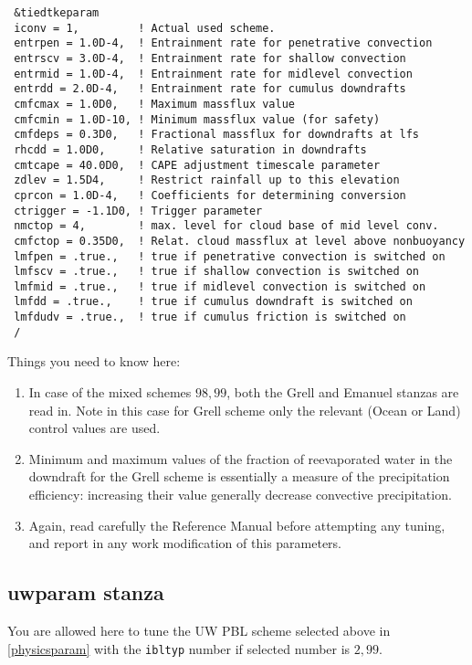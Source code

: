 {\begin{Verbatim}
 &tiedtkeparam
 iconv = 1,         ! Actual used scheme.
 entrpen = 1.0D-4,  ! Entrainment rate for penetrative convection
 entrscv = 3.0D-4,  ! Entrainment rate for shallow convection
 entrmid = 1.0D-4,  ! Entrainment rate for midlevel convection
 entrdd = 2.0D-4,   ! Entrainment rate for cumulus downdrafts
 cmfcmax = 1.0D0,   ! Maximum massflux value 
 cmfcmin = 1.0D-10, ! Minimum massflux value (for safety)
 cmfdeps = 0.3D0,   ! Fractional massflux for downdrafts at lfs
 rhcdd = 1.0D0,     ! Relative saturation in downdrafts
 cmtcape = 40.0D0,  ! CAPE adjustment timescale parameter
 zdlev = 1.5D4,     ! Restrict rainfall up to this elevation
 cprcon = 1.0D-4,   ! Coefficients for determining conversion
 ctrigger = -1.1D0, ! Trigger parameter
 nmctop = 4,        ! max. level for cloud base of mid level conv.
 cmfctop = 0.35D0,  ! Relat. cloud massflux at level above nonbuoyancy
 lmfpen = .true.,   ! true if penetrative convection is switched on
 lmfscv = .true.,   ! true if shallow convection is switched on
 lmfmid = .true.,   ! true if midlevel convection is switched on
 lmfdd = .true.,    ! true if cumulus downdraft is switched on
 lmfdudv = .true.,  ! true if cumulus friction is switched on
 /
\end{Verbatim}
}

Things you need to know here:

\begin{enumerate}
\item In case of the mixed schemes $98, 99$, both the Grell and Emanuel stanzas
are read in. Note in this case for Grell scheme only the relevant
(Ocean or Land) control values are used.
\item Minimum and maximum values of the fraction of reevaporated water in the
downdraft for the Grell scheme is essentially a measure of the precipitation
efficiency: increasing their value generally decrease convective precipitation.
\item Again, read carefully the Reference Manual before attempting any tuning,
and report in any work modification of this parameters.
\end{enumerate}

\subsection{uwparam stanza}

You are allowed here to tune the UW PBL scheme selected above in
\ref{physicsparam} with the \verb=ibltyp= number if selected number is
$2, 99$. 

